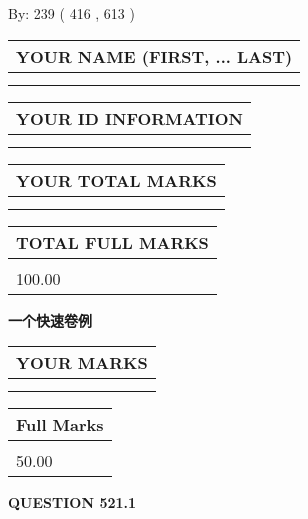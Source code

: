 \documentclass{ctexart}
\begin{document}
   
\hspace{1.0in} By: 
 239 ( 416 ,  613 )
   
   
   
   
\newpage 
\setcounter{page}{ 
   521001 } 
   
   
   
   
\noindent\begin{tabular}{|l|}
\hline
YOUR NAME (FIRST, ... LAST)  \\
\hline
 \\ 
 \\ 
\hline
\end{tabular}
\hspace{0.05in} \begin{tabular}{|l|}
\hline
 YOUR   ID   INFORMATION  \\
\hline
 \\ 
 \\ 
\hline
\end{tabular}
   
   
\vspace{0.2in}\noindent\begin{tabular}{|l|}
\hline
YOUR TOTAL MARKS  \\
\hline
 \\ 
 \\ 
\hline
\end{tabular}
\hspace{0.05in} \begin{tabular}{|l|}
\hline
TOTAL FULL MARKS  \\
\hline
 \\ 
100.00 \\
\hline
\end{tabular}
   
   
 \vspace{0.2in}
{\LARGE {\textbf{ 一个快速卷例}}}
   
   
  
\vspace{0.2in}
  
\noindent\begin{tabular}{|l|}
\hline
 YOUR MARKS  \\
\hline
 \\ 
 \\ 
\hline
\end{tabular}
\hspace{0.05in} \begin{tabular}{|l|}
\hline
 Full Marks  \\
\hline
 \\ 
50.00 \\
\hline
\end{tabular}
{\textbf{\Large{QUESTION
521.1 
}}}
  
\end{document}
